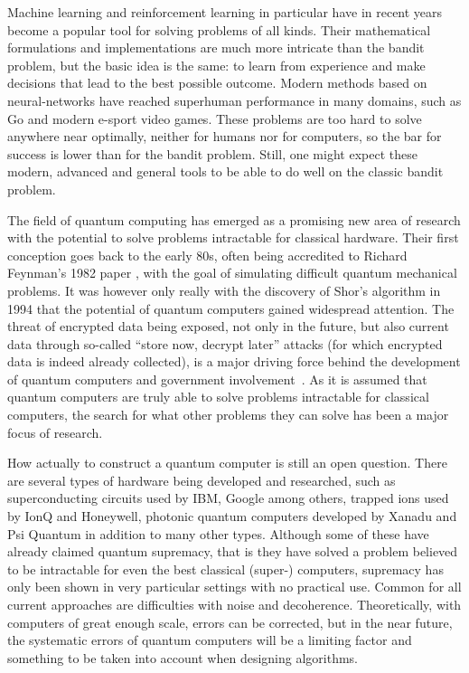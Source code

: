 Machine learning and reinforcement learning in particular have in recent years become a popular tool for solving problems of all kinds.
Their mathematical formulations and implementations are much more intricate than the bandit problem, but the basic idea is the same: to learn from experience and make decisions that lead to the best possible outcome.
Modern methods based on neural-networks have reached superhuman performance in many domains, such as Go and modern e-sport video games.
These problems are too hard to solve anywhere near optimally, neither for humans nor for computers, so the bar for success is lower than for the bandit problem.
Still, one might expect these modern, advanced and general tools to be able to do well on the classic bandit problem.

The field of quantum computing has emerged as a promising new area of research with the potential to solve problems intractable for classical hardware.
Their first conception goes back to the early 80s, often being accredited to Richard Feynman's 1982 paper \cite{feynman1982}, with the goal of simulating difficult quantum mechanical problems.
It was however only really with the discovery of Shor's algorithm in 1994 \cite{shor1994} that the potential of quantum computers gained widespread attention.
The threat of encrypted data being exposed, not only in the future, but also current data through so-called \enquote{store now, decrypt later} attacks (for which encrypted data is indeed already collected), is a major driving force behind the development of quantum computers and government involvement~\autocite{alagic2022, cisa2022}.
As it is assumed that quantum computers are truly able to solve problems intractable for classical computers, the search for what other problems they can solve has been a major focus of research.

How actually to construct a quantum computer is still an open question.
There are several types of hardware being developed and researched, such as superconducting circuits used by IBM, Google among others, trapped ions used by IonQ and Honeywell, photonic quantum computers developed by Xanadu and Psi Quantum in addition to many other types.
Although some of these have already claimed quantum supremacy, that is they have solved a problem believed to be intractable for even the best classical (super-) computers, supremacy has only been shown in very particular settings with no practical use.
Common for all current approaches are difficulties with noise and decoherence.
Theoretically, with computers of great enough scale, errors can be corrected, but in the near future, the systematic errors of quantum computers will be a limiting factor and something to be taken into account when designing algorithms.

